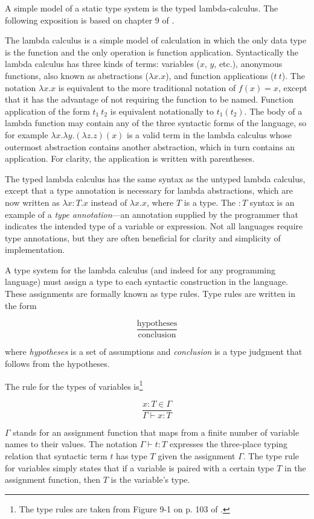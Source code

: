 \documentclass{article}
\begin{document}
A simple model of a static type system is the typed lambda-calculus. The following exposition is based on chapter 9 of \cite{types}.

The lambda calculus is a simple model of calculation in which the only data type is the function and the only operation is function application. Syntactically the lambda calculus has three kinds of terms: variables ($x$, $y$, etc.), anonymous functions, also known as abstractions ($\lambda x . x$), and function applications ($t\ t$). The notation $\lambda x . x$ is equivalent to the more traditional notation of $f(x) = x$, except that it has the advantage of not requiring the function to be named. Function application of the form $t_1\ t_2$ is equivalent notationally to $t_1(t_2)$. The body of a lambda function may contain any of the three syntactic forms of the language, so for example $\lambda x . \lambda y . (\lambda z . z)(x)$ is a valid term in the lambda calculus whose outermost abstraction contains another abstraction, which in turn contains an application. For clarity, the application is written with parentheses.

The typed lambda calculus has the same syntax as the untyped lambda calculus, except that a type annotation is necessary for lambda abstractions, which are now written as $\lambda x: T . x$ instead of $\lambda x. x$, where $T$ is a type. The $: T$ syntax is an example of a \textit{type annotation}---an annotation supplied by the programmer that indicates the intended type of a variable or expression. Not all languages require type annotations, but they are often beneficial for clarity and simplicity of implementation.

A type system for the lambda calculus (and indeed for any programming language) must assign a type to each syntactic construction in the language. These assignments are formally known as type rules. Type rules are written in the form

\[
\frac{\text{hypotheses}}
{\text{conclusion}}
\]

where \textit{hypotheses} is a set of assumptions and \textit{conclusion} is a type judgment that follows from the hypotheses.

The rule for the types of variables is\footnote{The type rules are taken from Figure 9-1 on p. 103 of \cite{types}.}

\[
\frac{x : T \in \Gamma}
{\Gamma \vdash x : T}
\]

$\Gamma$ stands for an assignment function that maps from a finite number of variable names to their values. The notation $\Gamma \vdash t : T$ expresses the three-place typing relation that syntactic term $t$ has type $T$ given the assignment $\Gamma$. The type rule for variables simply states that if a variable is paired with a certain type $T$ in the assignment function, then $T$ is the variable's type.
\end{document}

